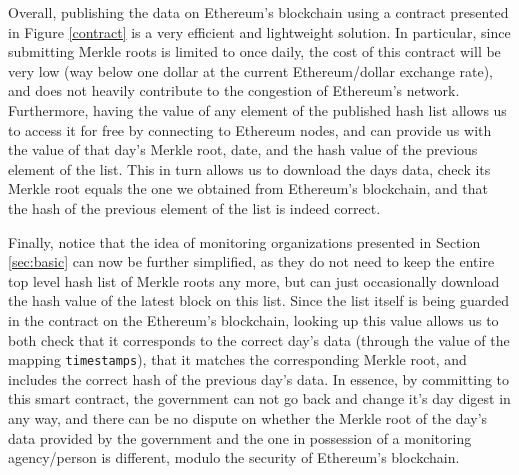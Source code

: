 Overall, publishing the data on Ethereum's blockchain using a contract presented in Figure \ref{contract} is a very efficient and lightweight solution. In particular, since submitting Merkle roots is limited to once daily, the cost of this contract will be very low (way below one dollar at the current Ethereum/dollar exchange rate), and does not heavily contribute to the congestion of Ethereum's network. Furthermore, having the value of any element of the published hash list allows us to access it for free by connecting to Ethereum nodes, and can provide us with the value of that day's Merkle root, date, and the hash value of the previous element of the list. This in turn allows us to download the days data, check its Merkle root equals the one we obtained from Ethereum's blockchain, and that the hash of the previous element of the list is indeed correct.

Finally, notice that the idea of monitoring organizations presented in Section \ref{sec:basic} can now be further simplified, as they do not need to keep the entire top level hash list of Merkle roots any more, but can just occasionally download the hash value of the latest block on this list. Since the list itself is being guarded in the contract on the Ethereum's blockchain, looking up this value allows us to both check that it corresponds to the correct day's data (through the value of the mapping \texttt{timestamps}), that it matches the corresponding Merkle root, and includes the correct hash of the previous day's data. In essence, by committing to this smart contract, the government can not go back and change it's day digest in any way, and there can be no dispute on whether the Merkle root of the day's data provided by the government and the one in possession of a monitoring agency/person is different, modulo the security of Ethereum's blockchain.

%
%
%
